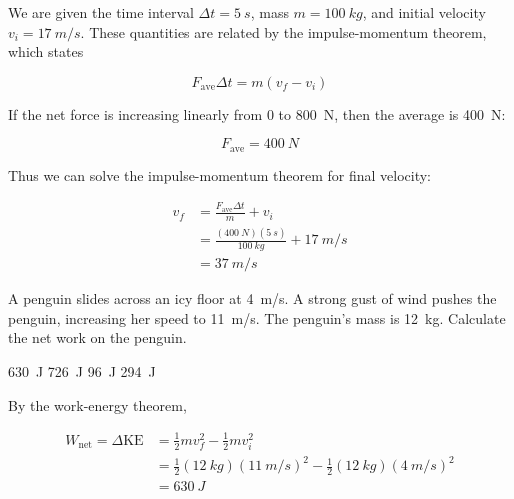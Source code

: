 \documentclass[answers]{exam}
\begin{document}
\begin{questions}
\begin{solution}
We are given the time interval $\Delta t = \SI{5}{s}$, mass $m = \SI{100}{kg}$, and initial velocity $v_i = \SI{17}{m/s}$. These quantities are related by the impulse-momentum theorem, which states 

\begin{equation*}
    F_\text{ave} \Delta t = m(v_f - v_i)
\end{equation*}

If the net force is increasing linearly from 0 to \SI{800}{N}, then the average is \SI{400}{N}:

\begin{equation*}
    F_\text{ave} = \SI{400}{N}
\end{equation*}

Thus we can solve the impulse-momentum theorem for final velocity:

\vspace{-1em}
\begin{align*}
    v_f &= \frac{F_\text{ave} \Delta t}{m} + v_i \\[1ex]
    &= \frac{(\SI{400}{N})(\SI{5}{s})}{\SI{100}{kg}} + \SI{17}{m/s} \\[1ex]
    &= \boxed{\SI{37}{m/s}}
\end{align*}
\end{solution}

\question 
A penguin slides across an icy floor at \SI{4}{m/s}. A strong gust of wind pushes the penguin, increasing her speed to \SI{11}{m/s}. The penguin's mass is \SI{12}{kg}. Calculate the net work on the penguin. 

\begin{randomizeoneparchoices}
    \correctchoice \SI{630}{J}
    \choice \SI{726}{J}
    \choice \SI{96}{J}
    \choice \SI{294}{J}
\end{randomizeoneparchoices}

\begin{solution}
By the work-energy theorem,

\vspace{-1em}
\begin{align*}
    W_\text{net} = \Delta \mathrm{KE} &= \frac{1}{2}mv_f^2 - \frac{1}{2}m v_i^2 \\[1ex]
    &= \frac{1}{2} (\SI{12}{kg}) (\SI{11}{m/s})^2 - \frac{1}{2} (\SI{12}{kg}) (\SI{4}{m/s})^2 \\[1ex]
    &= \boxed{\SI{630}{J}}
\end{align*}
\end{solution}


\end{questions}
\end{document}
